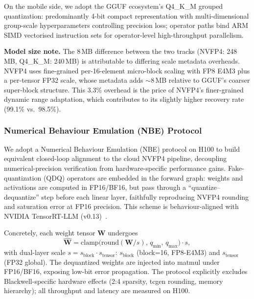 \documentclass[11pt, a4paper]{article}
\begin{document}
On the mobile side, we adopt the GGUF ecosystem's Q4\_K\_M grouped quantization: predominantly 4-bit compact representation with multi-dimensional group-scale hyperparameters controlling precision loss; operator paths bind ARM SIMD vectorised instruction sets for operator-level high-throughput parallelism.

\medskip
\noindent\textbf{Model size note.} The 8\,MB difference between the two tracks (NVFP4: 248\,MB, Q4\_K\_M: 240\,MB) is attributable to differing scale metadata overheads. NVFP4 uses fine-grained per-16-element micro-block scaling with FP8 E4M3 plus a per-tensor FP32 scale, whose metadata adds $\sim$8\,MB relative to GGUF's coarser super-block structure. This 3.3\% overhead is the price of NVFP4's finer-grained dynamic range adaptation, which contributes to its slightly higher recovery rate (99.1\% vs.\ 98.5\%).

\subsubsection{Numerical Behaviour Emulation (NBE) Protocol}

We adopt a Numerical Behaviour Emulation (NBE) protocol on H100 to build equivalent closed-loop alignment to the cloud NVFP4 pipeline, decoupling numerical-precision verification from hardware-specific performance gains. Fake-quantization (QDQ) operators are embedded in the forward graph: weights and activations are computed in FP16/BF16, but pass through a ``quantize--dequantize'' step before each linear layer, faithfully reproducing NVFP4 rounding and saturation error at FP16 precision. This scheme is behaviour-aligned with NVIDIA TensorRT-LLM (v0.13)~\cite{NVIDIA2024TRTLLMReleaseNotes,NVIDIA2024TensorRTLLMDocs}.

Concretely, each weight tensor $\bm{W}$ undergoes
\begin{equation}
\widehat{\bm{W}} = \mathrm{clamp}\!\bigl(\mathrm{round}(\bm{W}/s),\,q_{\min},\,q_{\max}\bigr)\cdot s,
\end{equation}
with dual-layer scale $s = s_{\text{block}}\!\cdot\!s_{\text{tensor}}$: $s_{\text{block}}$ (block=16, FP8-E4M3) and $s_{\text{tensor}}$ (FP32 global). The dequantized weights are injected into matmul under FP16/BF16, exposing low-bit error propagation. The protocol explicitly excludes Blackwell-specific hardware effects (2:4 sparsity, tcgen rounding, memory hierarchy); all throughput and latency are measured on H100.
\end{document}
